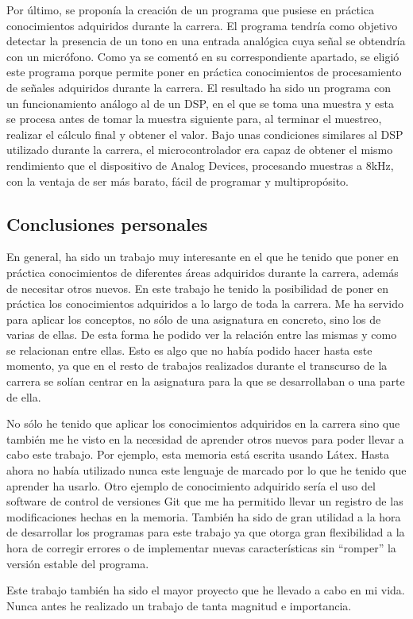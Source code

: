 Por último, se proponía la creación de un programa que pusiese en práctica conocimientos adquiridos durante la carrera. El programa tendría como objetivo detectar la presencia de un tono en una entrada analógica cuya señal se obtendría con un micrófono. Como ya se comentó en su correspondiente apartado, se eligió este programa porque permite poner en práctica conocimientos de procesamiento de señales adquiridos durante la carrera. El resultado ha sido un programa con un funcionamiento análogo al de un DSP, en el que se toma una muestra y esta se procesa antes de tomar la muestra siguiente para, al terminar el muestreo, realizar el cálculo final y obtener el valor. Bajo unas condiciones similares al DSP utilizado durante la carrera, el microcontrolador era capaz de obtener el mismo rendimiento que el dispositivo de Analog Devices, procesando muestras a 8kHz, con la ventaja de ser más barato, fácil de programar y multipropósito.

\subsection{Conclusiones personales}

En general, ha sido un trabajo muy interesante en el que he tenido que poner en práctica conocimientos de diferentes áreas adquiridos durante la carrera, además de necesitar otros nuevos.
En este trabajo he tenido la posibilidad de poner en práctica los conocimientos adquiridos a lo largo de toda la carrera. Me ha servido para aplicar los conceptos, no sólo de una asignatura en concreto, sino los de varias de ellas. De esta forma he podido ver la relación entre las mismas y como se relacionan entre ellas. Esto es algo que no había podido hacer hasta este momento, ya que en el resto de trabajos realizados durante el transcurso de la carrera se solían centrar en la asignatura para la que se desarrollaban o una parte de ella.

No sólo he tenido que aplicar los conocimientos adquiridos en la carrera sino que también me he visto en la necesidad de aprender otros nuevos para poder llevar a cabo este trabajo. Por ejemplo, esta memoria está escrita usando Látex. Hasta ahora no había utilizado nunca este lenguaje de marcado por lo que he tenido que aprender ha usarlo. Otro ejemplo de conocimiento adquirido sería el uso del software de control de versiones Git que me ha permitido llevar un registro de las modificaciones hechas en la memoria. También ha sido de gran utilidad a la hora de desarrollar los programas para este trabajo ya que otorga gran flexibilidad a la hora de corregir errores o de implementar nuevas características sin “romper” la versión estable del programa.

Este trabajo también ha sido el mayor proyecto que he llevado a cabo en mi vida. Nunca antes he realizado un trabajo de tanta magnitud e importancia.


